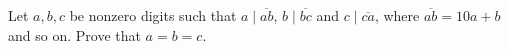 Let $a,b,c$ be nonzero digits such that $a\mid\overline{ab}$, $b\mid\overline{bc}$ and $c\mid\overline{ca}$, where $\overline{ab}=10a+b$ and so on. Prove that $a=b=c$.
